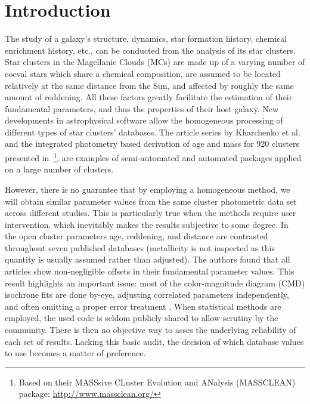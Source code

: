 \documentclass[draft]{aa}
\begin{document}

\maketitle
%

\section{Introduction}
\label{sec:intro}

The study of a galaxy's structure, dynamics, star formation history, chemical
enrichment history, etc., can be conducted from the analysis of its star
clusters.
Star clusters in the Magellanic Clouds (MCs) are made up of a varying number of
coeval stars which share a chemical composition, are assumed to be located
relatively at the same distance from the Sun, and affected by roughly the same
amount of reddening. All these factors greatly facilitate the estimation of
their fundamental parameters, and thus the properties of their host galaxy.
%
New developments in astrophysical software allow the homogeneous
processing of different types of star clusters' databases. The article series
by Kharchenko et al. 
\citep[see][and references therein]{Kharchenko_2005,Schmeja_2014}
and the integrated photometry based derivation of age and mass for 920 clusters
presented
in~\cite{Popescu_2012}\footnote{Based on their MASSsive CLuster Evolution and
ANalysis (MASSCLEAN) package: \url{http://www.massclean.org/}}, are examples of
semi-automated and automated packages applied on a large number of clusters.

However, there is no guarantee that by employing a homogeneous method, we will
obtain similar parameter values from the same cluster photometric
data set across different studies. This is particularly true when the methods
require user intervention, which inevitably makes the results subjective to some
degree.
%
In~\cite{Netopil_2015} the open cluster parameters age, reddening, and distance
are contrasted throughout seven published databases (metallicity is not
inspected as this quantity is usually assumed rather than adjusted).
The authors found that all articles show non-negligible offsets in their
fundamental parameter values.
%
This result highlights an important issue: most of the color-magnitude diagram 
(CMD) isochrone fits are done by-eye, adjusting correlated parameters
independently, and often omitting a proper error treatment \citep[see]
[for a more detailed description of this problem]{vonHippel_2014}.
When statistical methods are employed, the used code is seldom publicly
shared to allow scrutiny by the community. There is then no objective way to
asses the underlying reliability of each set of results.
Lacking this basic audit, the decision of which database values to use
becomes a matter of preference.
\end{document}
